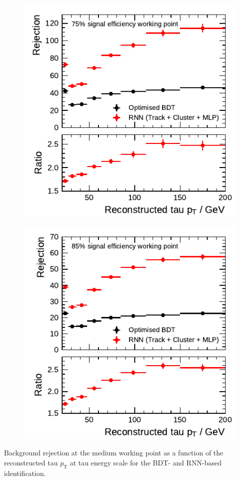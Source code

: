\noindent
\begin{minipage}{\textwidth}
  \captionsetup{type=figure}
  \begin{subfigure}[t]{0.48\textwidth}
    \centering
    \includegraphics{./figures/rnn/combined/rnn_medium_1p.pdf}
  \end{subfigure}\hfill
  \begin{subfigure}[t]{0.48\textwidth}
    \centering
    \includegraphics{./figures/rnn/combined/rnn_loose_1p.pdf}
  \end{subfigure}
  \caption{Background rejection at the medium working point as a function of the
    reconstructed tau $p_\text{T}$ at tau energy scale for the BDT- and
    RNN-based identification.}
\end{minipage}

